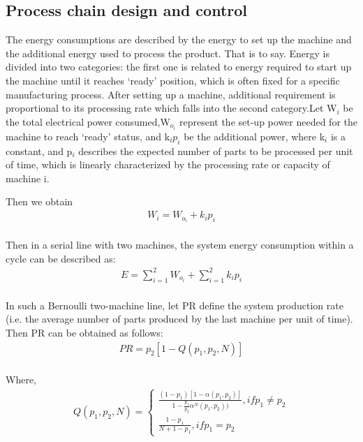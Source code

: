 \subsection{Process chain design and control}

The energy consumptions are described by the energy to set up the machine and the additional energy used to process the product. That is to say. Energy is divided into two categories: the first one is related to energy required to start up the machine until it reaches ‘ready’ position, which is often fixed for a specific manufacturing process. After setting up a machine, additional requirement is proportional to its processing rate which falls into the second category.Let W$_i$ be the total electrical power consumed,W$_{o_{i}}$ represent the set-up power needed for the machine to reach ‘ready’ status, and k$_{i}p_{i}$ be the additional power, where k$_i$ is a constant, and p$_i$ describes the expected number of parts to be processed per unit of time, which is linearly characterized by the processing rate or capacity of machine i\cite{Wen2016}.

Then we obtain 
\begin{equation} \label{eq:3.1}
\begin{split}
W_{i}=W_{o_{i}}+k_{i}p_{i}
\\
\end{split}
\end{equation}

Then in a serial line with two machines, the system energy consumption within a cycle can be described as:
\begin{equation} \label{eq:3.2}
\begin{split}
E=\sum_{i=1}^{2}W_{o_{i}}+\sum_{i=1}^{2}k_{i}p_{i}
\\
\end{split}
\end{equation}

In such a Bernoulli two-machine line, let PR define the system production rate (i.e. the average number of parts produced by the last machine per unit of time). Then PR can be obtained as follows:
\begin{equation} \label{eq:3.3}
\begin{split}
PR=p_{2}[1-Q(p_{1},p_{2},N)]
\\
\end{split}
\end{equation}

Where,
\begin{equation} \label{eq:3.4}
\begin{split}
Q(p_{1},p_{2},N)=\left\{\begin{matrix}
\frac{(1-p_{1})[1-\alpha(p_{1},p_{2})]}{1-\frac{p_{1}}{p_{2}}\alpha ^{N}(p_{1},p_{2}))} ,if p_{1}\neq p_{2}
\\ 
\frac{1-p_{1}}{N+1-p_{1}}, if p_{1}=p_{2}
\end{matrix}\right.
\\
\end{split}
\end{equation}

